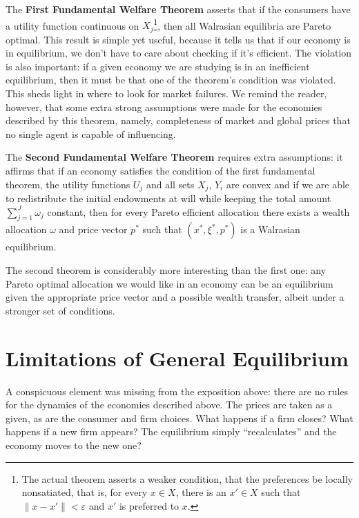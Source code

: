 The \textbf{First Fundamental Welfare Theorem} asserts that if the consumers have a utility function continuous on $X_j$\footnote{The actual theorem   asserts a weaker condition, that the preferences be locally nonsatiated, that is, for every $x \in X$, there is an $x' \in X$   such that $\|x - x'\| < \varepsilon$ and $x'$ is preferred to $x$.}, then all Walrasian equilibria are Pareto optimal. This result is simple yet useful, because it tells us that if our economy is in equilibrium, we don't have to care about checking if it's efficient. The violation is also important: if a given economy we are studying is in an inefficient equilibrium, then it must be that one of the theorem's condition was violated. This sheds light in where to look for market failures. We remind the reader, however, that some extra strong assumptions were made for the economies described by this theorem, namely, completeness of market and global prices that no single agent is capable of influencing.

The \textbf{Second Fundamental Welfare Theorem} requires extra assumptions: it affirms that if an economy satisfies the condition of the first fundamental theorem, the utility functions $U_j$ and all sets $X_j$, $Y_i$ are convex and if we are able to redistribute the initial endowments at will while keeping the total amount $\sum_{j=1}^J \omega_j$ constant, then for every Pareto efficient allocation there exists a wealth allocation $\omega$ and price vector $p^\ast$ such that $(x^\ast, \xi^\ast, p^\ast)$ is a Walrasian equilibrium.

The second theorem is considerably more interesting than the first one: any Pareto optimal allocation we would like in an economy can be an equilibrium given the appropriate price vector and a possible wealth transfer, albeit under a stronger set of conditions.

\section{Limitations of General Equilibrium}

A conspicuous element was missing from the exposition above: there are no rules for the dynamics of the economies described above. The prices are taken as a given, as are the consumer and firm choices. What happens if a firm closes? What happens if a new firm appears? The equilibrium simply ``recalculates'' and the economy moves to the new one?

